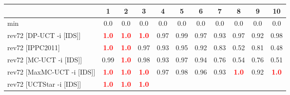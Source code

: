 \documentclass{article}
\begin{document}
\begin{tabular}{|l|r@{$\pm$}rr@{$\pm$}rr@{$\pm$}rr@{$\pm$}rr@{$\pm$}rr@{$\pm$}rr@{$\pm$}rr@{$\pm$}rr@{$\pm$}rr@{$\pm$}r|}
\hline

& \multicolumn{2}{c}{1}
& \multicolumn{2}{c}{2}
& \multicolumn{2}{c}{3}
& \multicolumn{2}{c}{4}
& \multicolumn{2}{c}{5}
& \multicolumn{2}{c}{6}
& \multicolumn{2}{c}{7}
& \multicolumn{2}{c}{8}
& \multicolumn{2}{c}{9}
& \multicolumn{2}{c|}{10}
\\
\hline
\hline
min
& \multicolumn{2}{c}{0.0}
& \multicolumn{2}{c}{0.0}
& \multicolumn{2}{c}{0.0}
& \multicolumn{2}{c}{0.0}
& \multicolumn{2}{c}{0.0}
& \multicolumn{2}{c}{0.0}
& \multicolumn{2}{c}{0.0}
& \multicolumn{2}{c}{0.0}
& \multicolumn{2}{c}{0.0}
& \multicolumn{2}{c|}{0.0}
\\
rev72 [DP-UCT -i [IDS]]
& \multicolumn{2}{c}{\textbf{\textcolor{red}{1.0}}}
& \multicolumn{2}{c}{\textbf{\textcolor{red}{1.0}}}
& \multicolumn{2}{c}{\textbf{\textcolor{red}{1.0}}}
& \multicolumn{2}{c}{0.97}
& \multicolumn{2}{c}{0.99}
& \multicolumn{2}{c}{0.97}
& \multicolumn{2}{c}{0.93}
& \multicolumn{2}{c}{0.97}
& \multicolumn{2}{c}{0.92}
& \multicolumn{2}{c|}{0.98}
\\
rev72 [IPPC2011]
& \multicolumn{2}{c}{\textbf{\textcolor{red}{1.0}}}
& \multicolumn{2}{c}{\textbf{\textcolor{red}{1.0}}}
& \multicolumn{2}{c}{0.97}
& \multicolumn{2}{c}{0.93}
& \multicolumn{2}{c}{0.95}
& \multicolumn{2}{c}{0.92}
& \multicolumn{2}{c}{0.83}
& \multicolumn{2}{c}{0.52}
& \multicolumn{2}{c}{0.81}
& \multicolumn{2}{c|}{0.48}
\\
rev72 [MC-UCT -i [IDS]]
& \multicolumn{2}{c}{0.99}
& \multicolumn{2}{c}{\textbf{\textcolor{red}{1.0}}}
& \multicolumn{2}{c}{0.98}
& \multicolumn{2}{c}{0.93}
& \multicolumn{2}{c}{0.97}
& \multicolumn{2}{c}{0.94}
& \multicolumn{2}{c}{0.76}
& \multicolumn{2}{c}{0.54}
& \multicolumn{2}{c}{0.76}
& \multicolumn{2}{c|}{0.51}
\\
rev72 [MaxMC-UCT -i [IDS]]
& \multicolumn{2}{c}{\textbf{\textcolor{red}{1.0}}}
& \multicolumn{2}{c}{\textbf{\textcolor{red}{1.0}}}
& \multicolumn{2}{c}{\textbf{\textcolor{red}{1.0}}}
& \multicolumn{2}{c}{0.97}
& \multicolumn{2}{c}{0.98}
& \multicolumn{2}{c}{0.96}
& \multicolumn{2}{c}{0.93}
& \multicolumn{2}{c}{\textbf{\textcolor{red}{1.0}}}
& \multicolumn{2}{c}{0.92}
& \multicolumn{2}{c|}{\textbf{\textcolor{red}{1.0}}}
\\
rev72 [UCTStar -i [IDS]]
& \multicolumn{2}{c}{\textbf{\textcolor{red}{1.0}}}
& \multicolumn{2}{c}{\textbf{\textcolor{red}{1.0}}}
& \multicolumn{2}{c}{\textbf{\textcolor{red}{1.0}}}

\end{tabular}
\end{document}

